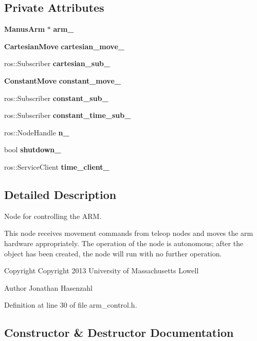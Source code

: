 \subsection*{\-Private \-Attributes}
\begin{DoxyCompactItemize}
\item 
{\bf \-Manus\-Arm} $\ast$ {\bf arm\-\_\-}
\item 
{\bf \-Cartesian\-Move} {\bf cartesian\-\_\-move\-\_\-}
\item 
ros\-::\-Subscriber {\bf cartesian\-\_\-sub\-\_\-}
\item 
{\bf \-Constant\-Move} {\bf constant\-\_\-move\-\_\-}
\item 
ros\-::\-Subscriber {\bf constant\-\_\-sub\-\_\-}
\item 
ros\-::\-Subscriber {\bf constant\-\_\-time\-\_\-sub\-\_\-}
\item 
ros\-::\-Node\-Handle {\bf n\-\_\-}
\item 
bool {\bf shutdown\-\_\-}
\item 
ros\-::\-Service\-Client {\bf time\-\_\-client\-\_\-}
\end{DoxyCompactItemize}


\subsection{\-Detailed \-Description}
\-Node for controlling the \-A\-R\-M. 

\-This node receives movement commands from teleop nodes and moves the arm hardware appropriately. \-The operation of the node is autonomous; after the object has been created, the node will run with no further operation.

\begin{DoxyCopyright}{\-Copyright}
\-Copyright 2013 \-University of \-Massachusetts \-Lowell 
\end{DoxyCopyright}
\begin{DoxyAuthor}{\-Author}
\-Jonathan \-Hasenzahl 
\end{DoxyAuthor}


\-Definition at line 30 of file arm\-\_\-control.\-h.



\subsection{\-Constructor \& \-Destructor \-Documentation}
